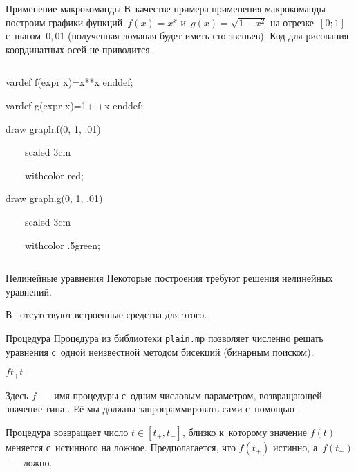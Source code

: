 \begin{frame}{Применение макрокоманды }
В~качестве примера применения макрокоманды  построим графики
функций $f(x)=x^x$ и~$g(x)=\sqrt{1-x^2}$ на отрезке $[0;1]$ с~шагом $0{,}01$
(полученная ломаная будет иметь сто звеньев). Код для рисования координатных
осей не приводится.

\begin{columns}
\centerline{}
\begin{programlisting}
vardef f(expr x)=x**x enddef;\par
vardef g(expr x)=1+-+x enddef;\par
\leavevmode\par
draw graph.f(0, 1, .01)\par
~~~~scaled 3cm\par
~~~~withcolor red;\par
draw graph.g(0, 1, .01)\par
~~~~scaled 3cm\par
~~~~withcolor .5green;
\end{programlisting}
\end{columns}
\end{frame}

\begin{frame}{Нелинейные уравнения}
Некоторые построения требуют решения нелинейных уравнений.

В~ отсутствуют встроенные средства для этого.
\end{frame}

\begin{frame}{Процедура }
Процедура  из библиотеки \nolinkurl{plain.mp} позволяет численно
решать уравнения с~одной неизвестной методом бисекций (бинарным поиском).

\begin{center}
\LARGE
{}$f$\literal{(}$t_+$\literal{,}$t_-$\literal{)}
\end{center}

Здесь $f$~— имя процедуры с~одним числовым параметром, возвращающей значение
типа . Её мы должны запрограммировать сами с~помощью
.

Процедура  возвращает число $t\in[t_+,t_-]$, близко к~которому
значение $f(t)$ меняется с~истинного на ложное. Предполагается, что $f(t_+)$
истинно, а~$f(t_-)$~— ложно.
\end{frame}


